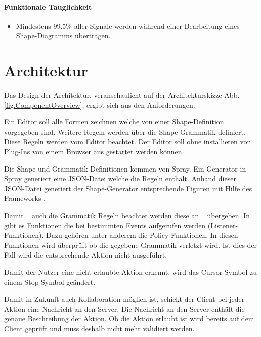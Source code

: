\paragraph{Funktionale Tauglichkeit}

\begin{itemize}
  \item Mindestens 99.5\% aller Signale werden während einer Bearbeitung eines Shape-Diagramms übertragen.
\end{itemize}



\section{Architektur}

Das Design der Architektur, veranschaulicht auf
der Architekturskizze Abb. \ref{fig.ComponentOverview},
ergibt sich aus den Anforderungen.

Ein Editor soll alle Formen zeichnen welche von einer Shape-Definition vorgegeben sind.
Weitere Regeln werden über die Shape Grammatik definiert. Diese Regeln werden vom Editor beachtet.
Der Editor soll ohne installieren von Plug-Ins von einem Browser aus gestartet werden können.

Die Shape und Grammatik-Definitionen kommen von Spray. Ein Generator in Spray generiert eine JSON-Datei welche die Regeln enthält.
Anhand dieser JSON-Datei generiert der Shape-Generator entsprechende Figuren mit Hilfe des Frameworks \dd.

Damit \dd~ auch die Grammatik Regeln beachtet werden diese an \dd~ übergeben.
In \dd~ gibt es Funktionen die bei bestimmten Events aufgerufen werden (Listener-Funktionen). Dazu gehören unter anderem die Policy-Funktionen.
In diesen Funktionen wird überprüft ob die gegebene Grammatik verletzt wird. Ist dies der Fall wird die entsprechende Aktion nicht ausgeführt.

Damit der Nutzer eine nicht erlaubte Aktion erkennt, wird das Cursor Symbol zu einem Stop-Symbol geändert.

Damit in Zukunft auch Kollaboration möglich ist, schickt der Client bei jeder Aktion eine Nachricht an den Server.
Die Nachricht an den Server enthält die genaue Beschreibung der Aktion.
Ob die Aktion erlaubt ist wird bereits auf dem Client geprüft und muss deshalb nicht mehr validiert werden.

